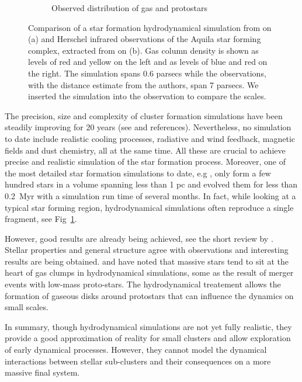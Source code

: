 \begin{figure}
\begin{subfigure}[b]{0.48\textwidth}
        \caption{Observed distribution of gas and protostars}
        \label{Fig:0_aquila_bate2012}
    \end{subfigure}
\caption[Hydrodynamical simulation of a star forming clump scaled to infrared observations]{Comparison of a star formation hydrodynamical simulation from \cite{Bate2012}  on (a) and Herschel infrared observations of the Aquila star forming complex, extracted from \cite{Konyves2010} on (b). Gas column density is shown as levels of red and yellow on the left and as levels of blue and red on the right. The simulation spans 0.6 parsecs while the observations, with the distance estimate from the authors, span 7 parsecs. We inserted the simulation into the observation to compare the scales.}
\label{Fig:0_clumps}
\end{figure}



The precision, size and complexity of cluster formation simulations have been steadily improving for 20 years (see \citealt{Turner1995,Klessen2000,Bate2003,Offner2009,Myers2014} and references). Nevertheless, no simulation to date include realistic cooling processes, radiative and wind feedback, magnetic fields and dust chemistry, all at the same time. All these are crucial to achieve precise and realistic simulation of the star formation process. Moreover, one of the most detailed star formation simulations to date, e.g \cite{Bate2012}, only form a few hundred stars in a volume spanning less than 1 pc and evolved them for less than 0.2~Myr with a simulation run time of several months. In fact, while looking at a typical star forming region, hydrodynamical simulations often reproduce a single fragment, see Fig~\ref{Fig:0_aquila_bate2012}.

However, good results are already being achieved, see the short review by \cite{Clarke2012}. Stellar properties and general structure agree with observations and interesting results are being obtained. \cite{Maschberger2011} and \cite{Moeckel2011} have noted that massive stars tend to sit at the heart of gas clumps in hydrodynamical simulations, some as the result of merger events with low-mass proto-stars. The hydrodynamical treatement allows the formation of gaseous disks around protostars that can influence the dynamics on small scales.

In summary, though hydrodynamical simulations are not yet fully realistic, they provide a good approximation of reality for small clusters and allow exploration of early dynamical processes. However, they cannot model the dynamical interactions between stellar sub-clusters and their consequences on a more massive final system.


